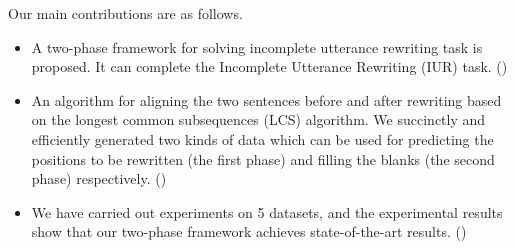 Our main contributions are as follows. 
\begin{itemize}
\item A
two-phase framework for solving incomplete utterance rewriting task is 
proposed. It can complete the Incomplete Utterance Rewriting (IUR) task. ()
\item  %
An algorithm 
for aligning the two sentences before and after rewriting
based on the longest common subsequences (LCS)
algorithm. 
We succinctly and efficiently generated
two kinds of data
which 
can be used for 
predicting the positions to be rewritten (the first phase)
and filling the blanks (the second phase)
respectively. ()
\item  %

We have carried out experiments on 5 datasets, and the experimental results show that our two-phase framework achieves state-of-the-art results. ()

\end{itemize}
